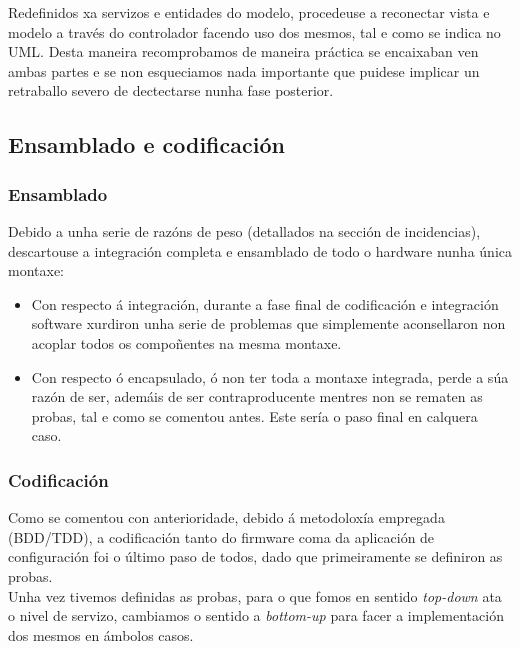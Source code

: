    Redefinidos xa servizos e entidades do modelo, procedeuse a reconectar vista
   e modelo a través do controlador facendo uso dos mesmos, tal e como se indica
   no UML. Desta maneira recomprobamos de maneira práctica se encaixaban ven
   ambas partes e se non esqueciamos nada importante que puidese implicar un
   retraballo severo de dectectarse nunha fase posterior.

 \subsection{Ensamblado e codificación}

  \subsubsection{Ensamblado}
  
  Debido a unha serie de razóns de peso (detallados na sección de incidencias),
  descartouse a integración completa e ensamblado de todo o hardware nunha única
  montaxe:
  
  \begin{itemize}
    \item Con respecto á integración, durante a fase final de codificación
        e integración software xurdiron unha serie de problemas que simplemente
        aconsellaron non acoplar todos os compoñentes na mesma montaxe.
    \item Con respecto ó encapsulado, ó non ter toda a montaxe integrada, perde
        a súa razón de ser, ademáis de ser contraproducente mentres non se
        rematen as probas, tal e como se comentou antes. Este sería o paso final
        en calquera caso.
   \end{itemize}

  \subsubsection{Codificación}
  
  Como se comentou con anterioridade, debido á metodoloxía empregada (BDD/TDD),
  a codificación tanto do firmware coma da aplicación de configuración foi o
  último paso de todos, dado que primeiramente se definiron as probas. \\
  
  Unha vez tivemos definidas as probas, para o que fomos en sentido
  \textit{top-down} ata o nivel de servizo, cambiamos o sentido a
  \textit{bottom-up} para facer a implementación dos mesmos en ámbolos casos.
  
